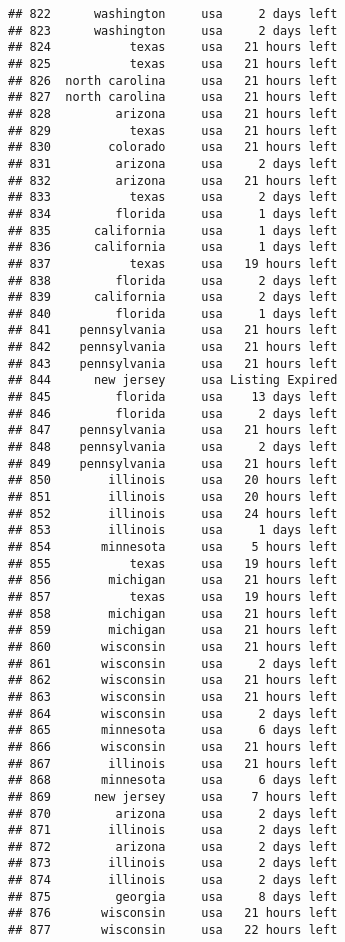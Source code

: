 \documentclass[
]{article}
\begin{document}
\begin{verbatim}
## 822      washington     usa     2 days left
## 823      washington     usa     2 days left
## 824           texas     usa   21 hours left
## 825           texas     usa   21 hours left
## 826  north carolina     usa   21 hours left
## 827  north carolina     usa   21 hours left
## 828         arizona     usa   21 hours left
## 829           texas     usa   21 hours left
## 830        colorado     usa   21 hours left
## 831         arizona     usa     2 days left
## 832         arizona     usa   21 hours left
## 833           texas     usa     2 days left
## 834         florida     usa     1 days left
## 835      california     usa     1 days left
## 836      california     usa     1 days left
## 837           texas     usa   19 hours left
## 838         florida     usa     2 days left
## 839      california     usa     2 days left
## 840         florida     usa     1 days left
## 841    pennsylvania     usa   21 hours left
## 842    pennsylvania     usa   21 hours left
## 843    pennsylvania     usa   21 hours left
## 844      new jersey     usa Listing Expired
## 845         florida     usa    13 days left
## 846         florida     usa     2 days left
## 847    pennsylvania     usa   21 hours left
## 848    pennsylvania     usa     2 days left
## 849    pennsylvania     usa   21 hours left
## 850        illinois     usa   20 hours left
## 851        illinois     usa   20 hours left
## 852        illinois     usa   24 hours left
## 853        illinois     usa     1 days left
## 854       minnesota     usa    5 hours left
## 855           texas     usa   19 hours left
## 856        michigan     usa   21 hours left
## 857           texas     usa   19 hours left
## 858        michigan     usa   21 hours left
## 859        michigan     usa   21 hours left
## 860       wisconsin     usa   21 hours left
## 861       wisconsin     usa     2 days left
## 862       wisconsin     usa   21 hours left
## 863       wisconsin     usa   21 hours left
## 864       wisconsin     usa     2 days left
## 865       minnesota     usa     6 days left
## 866       wisconsin     usa   21 hours left
## 867        illinois     usa   21 hours left
## 868       minnesota     usa     6 days left
## 869      new jersey     usa    7 hours left
## 870         arizona     usa     2 days left
## 871        illinois     usa     2 days left
## 872         arizona     usa     2 days left
## 873        illinois     usa     2 days left
## 874        illinois     usa     2 days left
## 875         georgia     usa     8 days left
## 876       wisconsin     usa   21 hours left
## 877       wisconsin     usa   22 hours left

\end{verbatim}
\end{document}
